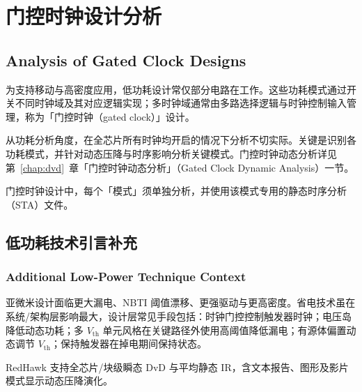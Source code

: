 \section{门控时钟设计分析}
\subsection*{Analysis of Gated Clock Designs}

为支持移动与高密度应用，低功耗设计常仅部分电路在工作。这些功耗模式通过开关不同时钟域及其对应逻辑实现；多时钟域通常由多路选择逻辑与时钟控制输入管理，称为「门控时钟（gated clock）」设计。

从功耗分析角度，在全芯片所有时钟均开启的情况下分析不切实际。关键是识别各功耗模式，并针对动态压降与时序影响分析关键模式。门控时钟动态分析详见第~\ref{chap:dvd}~章「门控时钟动态分析」（Gated Clock Dynamic Analysis）一节。

\begin{noteBox}
门控时钟设计中，每个「模式」须单独分析，并使用该模式专用的静态时序分析（STA）文件。
\end{noteBox}


\subsection{低功耗技术引言补充}
\subsubsection*{Additional Low-Power Technique Context}

亚微米设计面临更大漏电、NBTI 阈值漂移、更强驱动与更高密度。省电技术虽在系统/架构层影响最大，设计层常见手段包括：时钟门控控制触发器时钟；电压岛降低动态功耗；多 $V_{\mathrm{th}}$ 单元风格在关键路径外使用高阈值降低漏电；有源体偏置动态调节 $V_{\mathrm{th}}$；保持触发器在掉电期间保持状态。

RedHawk 支持全芯片/块级瞬态 DvD 与平均静态 IR，含文本报告、图形及影片模式显示动态压降演化。

